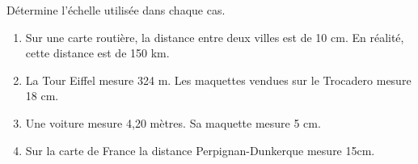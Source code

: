 
Détermine l'échelle utilisée dans chaque cas.
\begin{enumerate}
\item Sur une carte routière, la distance entre deux villes est de 10 cm. En réalité, cette distance est de 150 km.
\item La Tour Eiffel mesure 324 m. Les maquettes vendues sur le Trocadero mesure 18 cm.
\item Une voiture mesure 4,20 mètres. Sa maquette mesure 5 cm.
\item Sur la carte de France la distance Perpignan-Dunkerque mesure 15cm.
\end{enumerate}